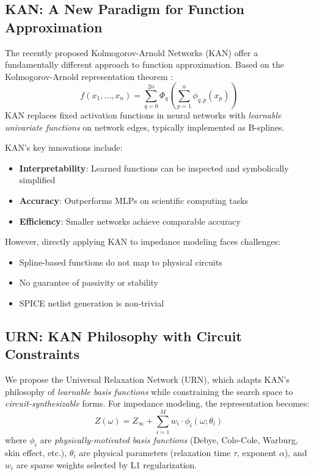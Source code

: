 \documentclass{ieeeaccess}
\begin{document}
\subsection{KAN: A New Paradigm for Function Approximation}

The recently proposed Kolmogorov-Arnold Networks (KAN) \cite{liu2024kan} offer a fundamentally different approach to function approximation. Based on the Kolmogorov-Arnold representation theorem \cite{kolmogorov1957representation,arnold1957functions}:
\begin{equation}
f(x_1, \ldots, x_n) = \sum_{q=0}^{2n} \Phi_q \left( \sum_{p=1}^{n} \phi_{q,p}(x_p) \right)
\end{equation}
KAN replaces fixed activation functions in neural networks with \textit{learnable univariate functions} on network edges, typically implemented as B-splines.

KAN's key innovations include:
\begin{itemize}
\item \textbf{Interpretability}: Learned functions can be inspected and symbolically simplified
\item \textbf{Accuracy}: Outperforms MLPs on scientific computing tasks
\item \textbf{Efficiency}: Smaller networks achieve comparable accuracy
\end{itemize}

However, directly applying KAN to impedance modeling faces challenges:
\begin{itemize}
\item Spline-based functions do not map to physical circuits
\item No guarantee of passivity or stability
\item SPICE netlist generation is non-trivial
\end{itemize}

\subsection{URN: KAN Philosophy with Circuit Constraints}

We propose the Universal Relaxation Network (URN), which adapts KAN's philosophy of \textit{learnable basis functions} while constraining the search space to \textit{circuit-synthesizable} forms. For impedance modeling, the representation becomes:
\begin{equation}
Z(\omega) = Z_\infty + \sum_{i=1}^{M} w_i \cdot \phi_i(\omega; \theta_i)
\label{eq:urn}
\end{equation}
where $\phi_i$ are \textit{physically-motivated basis functions} (Debye, Cole-Cole, Warburg, skin effect, etc.), $\theta_i$ are physical parameters (relaxation time $\tau$, exponent $\alpha$), and $w_i$ are sparse weights selected by L1 regularization.
\end{document}
